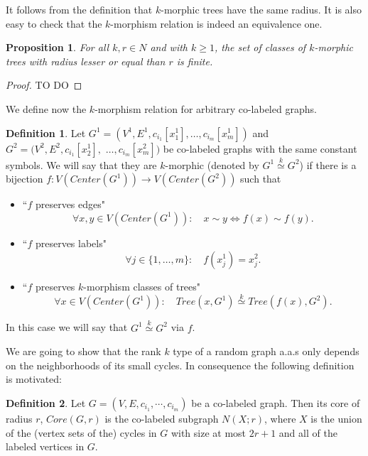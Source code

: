 \documentclass[11pt,notitlepage]{report}
\newtheorem{proposition}{Proposition}[chapter]
\theoremstyle{definition}
\newtheorem{definition}{Definition}[chapter]
\newcommand{\clist}{c_{i_1}, \cdots, c_{i_m}}
\newcommand{\morph}[1]{\stackrel{#1}{\simeq}}
\begin{document}
It follows from the definition that $k$-morphic trees have the same radius. 
It is also easy to check that the $k$-morphism relation is indeed an equivalence one. 

\begin{proposition}
	For all $k,r\in N$ and with $k\geq 1$, the set of classes of $k$-morphic trees
	with radius lesser or equal than $r$ is finite.
\end{proposition}
\begin{proof}
TO DO
\end{proof}

We define now the $k$-morphism relation for arbitrary co-labeled graphs. 

\begin{definition}
	Let $G^1=(V^1,E^1,c_{i_1}[x^1_1],\dots, c_{i_m}[x_m^1])$ and  $G^2=(V^2,E^2,c_{i_1}[x^1_2],$ 
	$\dots, c_{i_m}[x_m^2])$ be co-labeled graphs with the same constant symbols. 
	We will say that they are $k$-morphic (denoted by $G^1 \morph{k}G^2$) if there is
	a bijection $f: V(Center(G^1))\rightarrow V(Center(G^2))$ such that
	\begin{itemize}
		\item ``$f$ preserves edges"
		\[\forall x,y\in V(Center(G^1)): \quad  x\sim y \iff f(x)\sim f(y). \]
		\item ``$f$ preserves labels"
		\[\forall j\in \{1,\dots,m\}: \quad f(x^1_j) = x^2_j.\]
		\item ``$f$ preserves $k$-morphism classes of trees"
		\[\forall x\in V(Center(G^1)): \quad  Tree(x,G^1)\morph{k} Tree(f(x),G^2).\]
	\end{itemize}
	In this case we will say that $G^1 \morph{k} G^2$ via $f$. 	
\end{definition}

We are going to show that the rank $k$ type of a random graph a.a.s only 
depends on the neighborhoods of its small cycles. In consequence the following definition
is motivated:

\begin{definition} 
	Let $G=(V,E,\clist)$ be a co-labeled graph. Then its core of radius $r$, $Core(G,r)$
	is the co-labeled subgraph $N(X;r)$, where $X$ is the union of the (vertex sets of the)
	cycles in $G$ with size at most $2r+1$ and all of the labeled vertices in $G$. 
\end{definition}



\end{document}
